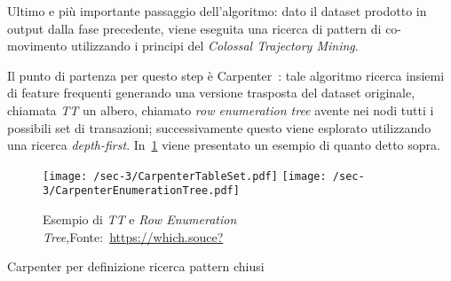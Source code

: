 Ultimo e più importante passaggio dell'algoritmo: dato il dataset prodotto in output dalla fase precedente,
viene eseguita una ricerca di pattern di co-movimento utilizzando i principi del \textit{Colossal Trajectory Mining}.

Il punto di partenza per questo step è Carpenter~\cite{DBLP:conf/kdd/PanCTYZ03}: tale algoritmo ricerca
insiemi di feature frequenti generando una versione trasposta del dataset originale, chiamata \textit{TT} un albero, chiamato \textit{row enumeration tree} avente nei nodi tutti i possibili set di transazioni;
successivamente questo viene esplorato utilizzando una ricerca \textit{depth-first}.
In~\cref{fig:chap-3:carpenter} viene presentato un esempio di quanto detto sopra.

\begin{figure}
  \centering
  \texttt{[image: /sec-3/CarpenterTableSet.pdf]}
  \texttt{[image: /sec-3/CarpenterEnumerationTree.pdf]}
  \caption{Esempio di \textit{TT} e \textit{Row Enumeration Tree},Fonte:~\url{https://which.souce?}}%
  \label{fig:chap-3:carpenter}
\end{figure}

Carpenter per definizione ricerca pattern chiusi
